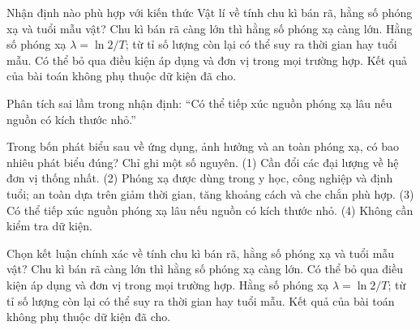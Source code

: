 \begin{ex}
Nhận định nào phù hợp với kiến thức Vật lí về tính chu kì bán rã, hằng số phóng xạ và tuổi mẫu vật?
\choice
{Chu kì bán rã càng lớn thì hằng số phóng xạ càng lớn.}
{\True Hằng số phóng xạ $\lambda=\ln2/T$; từ tỉ số lượng còn lại có thể suy ra thời gian hay tuổi mẫu.}
{Có thể bỏ qua điều kiện áp dụng và đơn vị trong mọi trường hợp.}
{Kết quả của bài toán không phụ thuộc dữ kiện đã cho.}
\end{ex}

\begin{bt}
Phân tích sai lầm trong nhận định: “Có thể tiếp xúc nguồn phóng xạ lâu nếu nguồn có kích thước nhỏ.”
\end{bt}

\begin{ex}
Trong bốn phát biểu sau về ứng dụng, ảnh hưởng và an toàn phóng xạ, có bao nhiêu phát biểu đúng? Chỉ ghi một số nguyên. (1) Cần đổi các đại lượng về hệ đơn vị thống nhất. (2) Phóng xạ được dùng trong y học, công nghiệp và định tuổi; an toàn dựa trên giảm thời gian, tăng khoảng cách và che chắn phù hợp. (3) Có thể tiếp xúc nguồn phóng xạ lâu nếu nguồn có kích thước nhỏ. (4) Không cần kiểm tra dữ kiện.
\end{ex}

\begin{ex}
Chọn kết luận chính xác về tính chu kì bán rã, hằng số phóng xạ và tuổi mẫu vật?
\choice
{Chu kì bán rã càng lớn thì hằng số phóng xạ càng lớn.}
{Có thể bỏ qua điều kiện áp dụng và đơn vị trong mọi trường hợp.}
{\True Hằng số phóng xạ $\lambda=\ln2/T$; từ tỉ số lượng còn lại có thể suy ra thời gian hay tuổi mẫu.}
{Kết quả của bài toán không phụ thuộc dữ kiện đã cho.}
\end{ex}

